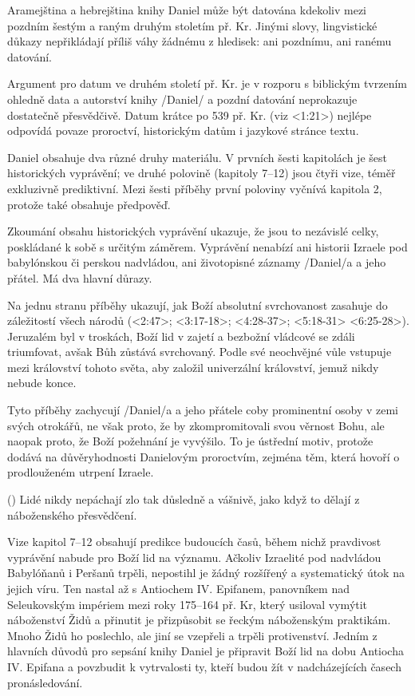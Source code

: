Aramejština a hebrejština knihy Daniel může být datována kdekoliv mezi pozdním šestým a raným druhým stoletím př. Kr. Jinými slovy, lingvistické důkazy nepřikládají příliš váhy žádnému z hledisek: ani pozdnímu, ani ranému datování.

Argument pro datum ve druhém století př. Kr. je v rozporu s biblickým tvrzením ohledně data a autorství knihy \x/Daniel/ a pozdní datování neprokazuje dostatečně přesvědčivě.   Datum krátce po 539 př. Kr. (viz <1:21>) nejlépe odpovídá povaze proroctví, historickým datům i jazykové stránce textu.


 
 Daniel obsahuje dva různé druhy materiálu.
 V prvních šesti kapitolách je šest historických vyprávění; ve druhé polovině (kapitoly 7--12) jsou čtyři vize, téměř exkluzivně prediktivní. Mezi šesti příběhy první poloviny vyčnívá kapitola 2, protože také obsahuje předpověď. 

Zkoumání obsahu historických vyprávění ukazuje, že jsou to nezávislé celky, poskládané k sobě s určitým záměrem.
Vyprávění nenabízí ani historii Izraele pod babylónskou či perskou nadvládou, ani životopisné záznamy \x/Daniel/a a jeho přátel. Má dva hlavní důrazy.

Na jednu stranu příběhy ukazují, jak Boží absolutní svrchovanost zasahuje do záležitostí všech národů 
(<2:47>; <3:17-18>; <4:28-37>; <5:18-31> <6:25-28>).
Jeruzalém byl v troskách, Boží lid v zajetí a bezbožní vládcové se zdáli triumfovat, avšak Bůh zůstává svrchovaný.
Podle své neochvějné vůle vstupuje mezi království tohoto světa, aby založil univerzální království, jemuž nikdy nebude konce.

Tyto příběhy zachycují \x/Daniel/a a jeho přátele coby prominentní osoby v zemi svých otrokářů, ne však proto, že by zkompromitovali svou věrnost Bohu, ale naopak proto, že Boží požehnání je vyvýšilo.
To je ústřední motiv, protože dodává na důvěryhodnosti Danielovým proroctvím, zejména těm, která hovoří o prodlouženém utrpení Izraele. 


 (\kern-2mm) {
Lidé nikdy nepáchají zlo tak důsledně a vášnivě,
jako když to dělají z náboženského přesvědčení.
}

Vize kapitol 7--12 obsahují predikce budoucích časů, během nichž pravdivost vyprávění nabude pro Boží lid na významu.
Ačkoliv Izraelité pod nadvládou Babylóňanů i Peršanů trpěli, nepostihl je žádný rozšířený a systematický útok na jejich víru. Ten nastal až s Antiochem IV. Epifanem, panovníkem nad Seleukovským impériem mezi roky 175--164 př. Kr, který usiloval vymýtit náboženství Židů a přinutit je přizpůsobit se řeckým náboženským praktikám. Mnoho Židů ho poslechlo, ale jiní se vzepřeli a trpěli protivenství. 
Jedním z hlavních důvodů pro sepsání knihy Daniel je připravit Boží lid na dobu Antiocha IV. Epifana a povzbudit k vytrvalosti ty, kteří budou žít v nadcházejících časech pronásledování.


